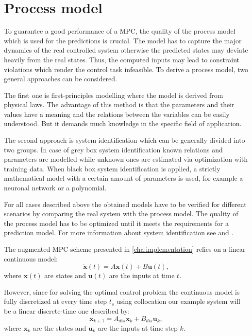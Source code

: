 \section{Process model}
\label{sec:processmodel}

To guarantee a good performance of a MPC, the quality of the process model which is used for the predictions is crucial.
The model has to capture the major dynamics of the real controlled system otherwise the predicted states may deviate heavily from the real states.
Thus, the computed inputs may lead to constraint violations which render the control task infeasible.
To derive a process model, two general approaches can be considered.

The first one is first-principles modelling where the model is derived from physical laws.
The advantage of this method is that the parameters and their values have a meaning and the relations between the variables can be easily understood.
But it demands much knowledge in the specific field of application.

The second approach is system identification which can be generally divided into two groups.
In case of grey box system identification known relations and parameters are modelled while unknown ones are estimated via optimization with training data.
When black box system identification is applied, a strictly mathematical model with a certain amount of parameters is used, for example a neuronal network or a polynomial.

For all cases described above the obtained models have to be verified for different scenarios by comparing the real system with the process model.
The quality of the process model has to be optimized until it meets the requirements for a prediction model.
For more information about system identification see \cite{Isermann.2011} and \cite{Ljung.2012}.

The augmented MPC scheme presented in \cref{cha:implementation} relies on a linear continuous model:
\begin{equation}\label{eq:linss_cont}
\dot{\mathbf{x}}(t) = A\mathbf{x}(t)+B\mathbf{u}(t),
\end{equation}
where $\mathbf{x}(t)$ are states and $\mathbf{u}(t)$ are the inputs at time $t$.

However, since for solving the optimal control problem the continuous model is fully discretized at every time step $t_s$ using collocation our example system will be a linear discrete-time one described by:
\begin{equation}\label{eq:linss}
\mathbf{x}_{k+1}=A_{dis}\mathbf{x}_k+B_{dis}\mathbf{u}_k,
\end{equation}
where $\mathbf{x}_k$ are the states and $\mathbf{u}_k$ are the inputs at time step $k$.

